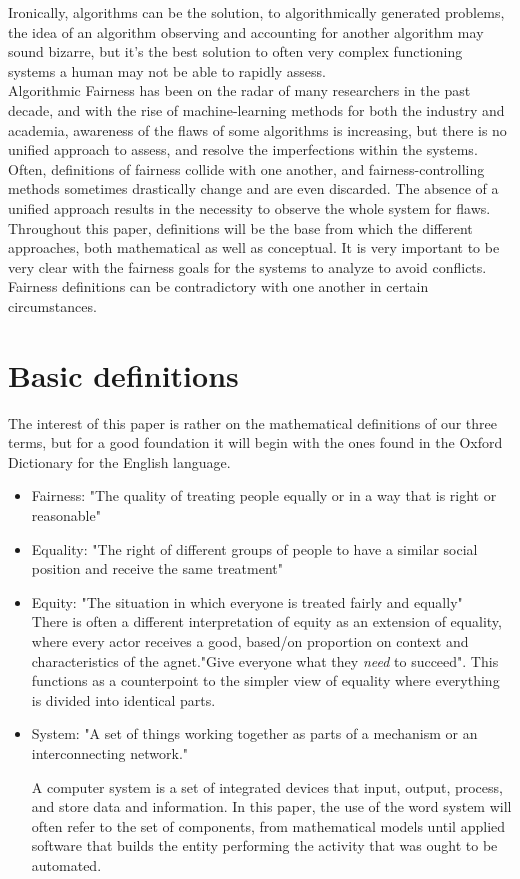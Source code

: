 Ironically, algorithms can be the solution, to algorithmically generated problems, the idea of an algorithm observing and accounting for another algorithm may sound bizarre, but it's the best solution to often very complex functioning systems a human may not be able to rapidly assess. \\
Algorithmic Fairness has been on the radar of many researchers in the past decade, and with the rise of machine-learning methods for both the industry and academia, awareness of the flaws of some algorithms  is increasing, but there is no unified approach to assess, and resolve the imperfections within the systems. Often, definitions of fairness collide with one another, and fairness-controlling methods sometimes drastically change and are even discarded. The absence of a unified approach results in the necessity to observe the whole system for flaws. \\
Throughout this paper, definitions will be the base from which the different approaches, both mathematical as well as conceptual. It is very important to be very clear with the fairness goals for the systems to analyze to avoid conflicts. Fairness definitions can be contradictory with one another in certain circumstances\cite{CPF*17}.
\section{Basic definitions}
The interest of this paper is rather on the mathematical definitions of our three terms, but for a good foundation it will begin with the ones found in the Oxford Dictionary for the English language.
\begin{itemize}
  \item Fairness:
  "The quality of treating people equally or in a way that is right or reasonable"\cite{Fairness}
  \item Equality:
  "The right of different groups of people to have a similar social position and receive the same treatment"\cite{Equality}
  \item Equity:
  "The situation in which everyone is treated fairly and equally"\cite{Equity}\\
  There is often a different interpretation of equity as an extension of equality, where every actor receives a good, based/on proportion on context and characteristics of the agnet."Give everyone what they \textsl{need} to succeed". This functions as a counterpoint to the simpler view of equality where everything is divided into identical parts.
  \item System:\cite{Compsysbias}
  "A set of things working together as parts of a mechanism or an interconnecting network."

  A computer system is a set of integrated devices that input, output, process, and store data and information.
  In this paper, the use of the word system will often refer to the set of components, from mathematical models until applied software that builds the entity performing the activity that was ought to be automated.
\end{itemize}
